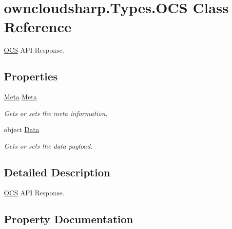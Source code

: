 \hypertarget{classowncloudsharp_1_1_types_1_1_o_c_s}{}\section{owncloudsharp.\+Types.\+O\+CS Class Reference}
\label{classowncloudsharp_1_1_types_1_1_o_c_s}


\hyperlink{classowncloudsharp_1_1_types_1_1_o_c_s}{O\+CS} A\+PI Response.  


\subsection*{Properties}
\begin{DoxyCompactItemize}
\item 
\hyperlink{classowncloudsharp_1_1_types_1_1_meta}{Meta} \hyperlink{classowncloudsharp_1_1_types_1_1_o_c_s_a7fed97a3502a80df264f5c38651be4c1}{Meta}
\begin{DoxyCompactList}\small\item\em Gets or sets the meta information. \end{DoxyCompactList}\item 
object \hyperlink{classowncloudsharp_1_1_types_1_1_o_c_s_ad64d4fa0e0f73ba19a0eb97b9d30f2bd}{Data}
\begin{DoxyCompactList}\small\item\em Gets or sets the data payload. \end{DoxyCompactList}\end{DoxyCompactItemize}


\subsection{Detailed Description}
\hyperlink{classowncloudsharp_1_1_types_1_1_o_c_s}{O\+CS} A\+PI Response. 



\subsection{Property Documentation}
\mbox{\label{classowncloudsharp_1_1_types_1_1_o_c_s_ad64d4fa0e0f73ba19a0eb97b9d30f2bd}} 
